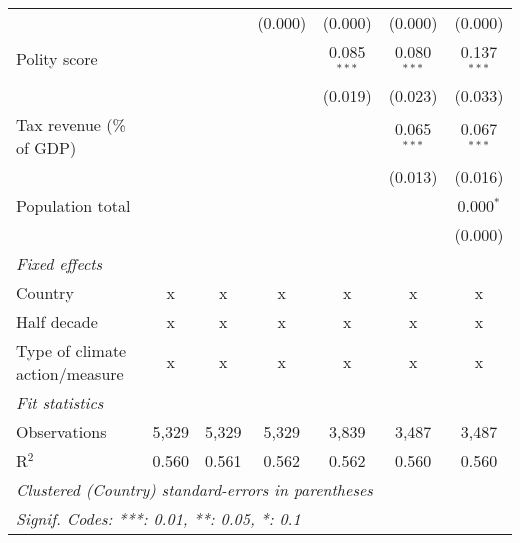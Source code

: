 \begin{tabular}{lcccccc}
                                                                            &         &                & (0.000)        & (0.000)        & (0.000)        & (0.000)\\   
   Polity score                                                             &         &                &                & 0.085$^{***}$  & 0.080$^{***}$  & 0.137$^{***}$\\   
                                                                            &         &                &                & (0.019)        & (0.023)        & (0.033)\\   
   Tax revenue (\% of GDP)                                                  &         &                &                &                & 0.065$^{***}$  & 0.067$^{***}$\\   
                                                                            &         &                &                &                & (0.013)        & (0.016)\\   
   Population total                                                         &         &                &                &                &                & 0.000$^{*}$\\   
                                                                            &         &                &                &                &                & (0.000)\\   
   \emph{Fixed effects}\\
   Country                                                                  & x       & x              & x              & x              & x              & x\\  
   Half decade                                                              & x       & x              & x              & x              & x              & x\\  
   Type of climate action/measure                                           & x       & x              & x              & x              & x              & x\\  
   \midrule \emph{Fit statistics}\\
   Observations                                                             & 5,329   & 5,329          & 5,329          & 3,839          & 3,487          & 3,487\\  
   R$^2$                                                                    & 0.560   & 0.561          & 0.562          & 0.562          & 0.560          & 0.560\\  
   \midrule
   \multicolumn{7}{l}{\emph{Clustered (Country) standard-errors in parentheses}}\\
   \multicolumn{7}{l}{\emph{Signif. Codes: ***: 0.01, **: 0.05, *: 0.1}}\\
\end{tabular}
\par\endgroup


